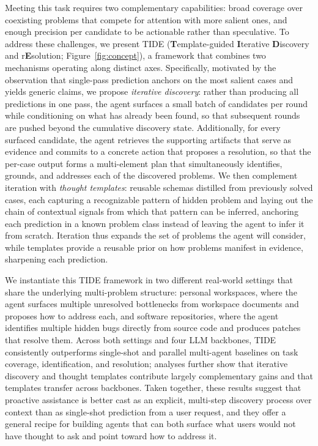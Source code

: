 \documentclass{llmxive}
\begin{document}
Meeting this task requires two complementary capabilities: broad coverage over coexisting problems that compete for attention with more salient ones, and enough precision per candidate to be actionable rather than speculative. To address these challenges, we present \textsc{TIDE} (\textbf{T}emplate-guided \textbf{I}terative \textbf{D}iscovery and r\textbf{E}solution; Figure~\ref{fig:concept}), a framework that combines two mechanisms operating along distinct axes. Specifically, motivated by the observation that single-pass prediction anchors on the most salient cases and yields generic claims, we propose \textit{iterative discovery}: rather than producing all predictions in one pass, the agent surfaces a small batch of candidates per round while conditioning on what has already been found, so that subsequent rounds are pushed beyond the cumulative discovery state. Additionally, for every surfaced candidate, the agent retrieves the supporting artifacts that serve as evidence and commits to a concrete action that proposes a resolution, so that the per-case output forms a multi-element plan that simultaneously identifies, grounds, and addresses each of the discovered problems. We then complement iteration with \textit{thought templates}: reusable schemas distilled from previously solved cases, each capturing a recognizable pattern of hidden problem and laying out the chain of contextual signals from which that pattern can be inferred, anchoring each prediction in a known problem class instead of leaving the agent to infer it from scratch. Iteration thus expands the set of problems the agent will consider, while templates provide a reusable prior on how problems manifest in evidence, sharpening each prediction.

We instantiate this \textsc{TIDE} framework in two different real-world settings that share the underlying multi-problem structure: personal workspaces, where the agent surfaces multiple unresolved bottlenecks from workspace documents and proposes how to address each, and software repositories, where the agent identifies multiple hidden bugs directly from source code and produces patches that resolve them. Across both settings and four LLM backbones, \textsc{TIDE} consistently outperforms single-shot and parallel multi-agent baselines on task coverage, identification, and resolution; analyses further show that iterative discovery and thought templates contribute largely complementary gains and that templates transfer across backbones. Taken together, these results suggest that proactive assistance is better cast as an explicit, multi-step discovery process over context than as single-shot prediction from a user request, and they offer a general recipe for building agents that can both surface what users would not have thought to ask and point toward how to address it.
\end{document}
